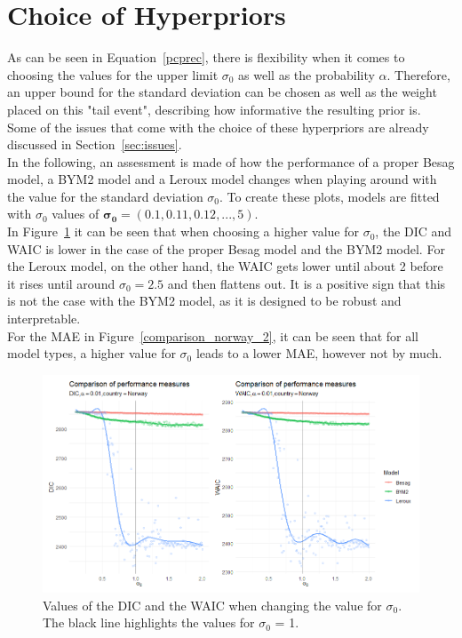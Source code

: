 \section{Choice of Hyperpriors}\label{sec:hyperprios}
As can be seen in Equation~\ref{pcprec}, there is flexibility when it comes to choosing the values for the upper limit $\sigma_0$ as well as the probability $\alpha$. Therefore, an upper bound for the standard deviation can be chosen as well as the weight placed on this "tail event", describing how informative the resulting prior is. \\
Some of the issues that come with the choice of these hyperpriors are already discussed in Section~\ref{sec:issues}. \\
In the following, an assessment is made of how the performance of a proper Besag model, a BYM2 model and a Leroux model changes when playing around with the value for the standard deviation $\sigma_0$. To create these plots, models are fitted with $\sigma_0$ values of $\pmb{\sigma_0}=\left(0.1,0.11,0.12,...,5\right)$.\\
In Figure~\ref{comparison_norway_1} it can be seen that when choosing a higher value for $\sigma_0$, the DIC and WAIC is lower in the case of the proper Besag model and the BYM2 model. For the Leroux model, on the other hand, the WAIC gets lower until about 2 before it rises until around $\sigma_0 = 2.5$ and then flattens out. It is a positive sign that this is not the case with the BYM2 model, as it is designed to be robust and interpretable. \\
For the MAE in Figure~\ref{comparison_norway_2}, it can be seen that for all model types, a higher value for $\sigma_0$ leads to a lower MAE, however not by much.
\begin{figure}[H]
  \centering
  \includegraphics[width = \textwidth]{comparison_1_norway.png}
  \caption{Values of the DIC and the WAIC when changing the value for $\sigma_0$. The black line highlights the values for $\sigma_0$ = 1.}
  \label{comparison_norway_1}
\end{figure}
